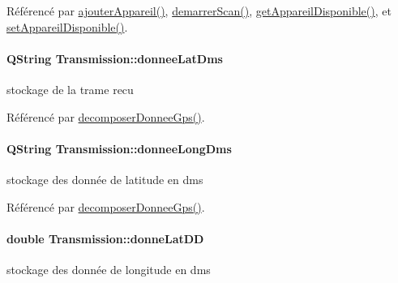 Référencé par \hyperlink{class_transmission_aeeccf41fd32a4bb17d3312d785aec98a}{ajouter\+Appareil()}, \hyperlink{class_transmission_a217b97344fdad09dbe226c55a8ac56b0}{demarrer\+Scan()}, \hyperlink{class_transmission_a2a38d0633b4a27dfa3754efcd3db4f9c}{get\+Appareil\+Disponible()}, et \hyperlink{class_transmission_ad2c1d8838a1f7ed8d3599dba0a118a86}{set\+Appareil\+Disponible()}.

\paragraph[{\texorpdfstring{donnee\+Lat\+Dms}{donneeLatDms}}]{\setlength{\rightskip}{0pt plus 5cm}Q\+String Transmission\+::donnee\+Lat\+Dms\hspace{0.3cm}{\ttfamily [private]}}\hypertarget{class_transmission_a82596aa40988da67b05174375d9cfadb}{}\label{class_transmission_a82596aa40988da67b05174375d9cfadb}
stockage de la trame recu 

Référencé par \hyperlink{class_transmission_acc25e99cce910d23efe684cad233d30e}{decomposer\+Donnee\+Gps()}.

\paragraph[{\texorpdfstring{donnee\+Long\+Dms}{donneeLongDms}}]{\setlength{\rightskip}{0pt plus 5cm}Q\+String Transmission\+::donnee\+Long\+Dms\hspace{0.3cm}{\ttfamily [private]}}\hypertarget{class_transmission_abd43fbd8ce97a99ebfd1048a9b2297cf}{}\label{class_transmission_abd43fbd8ce97a99ebfd1048a9b2297cf}
stockage des donnée de latitude en dms 

Référencé par \hyperlink{class_transmission_acc25e99cce910d23efe684cad233d30e}{decomposer\+Donnee\+Gps()}.

\paragraph[{\texorpdfstring{donne\+Lat\+DD}{donneLatDD}}]{\setlength{\rightskip}{0pt plus 5cm}double Transmission\+::donne\+Lat\+DD\hspace{0.3cm}{\ttfamily [private]}}\hypertarget{class_transmission_a4c7537ba62aa4ffa286ef269974e9571}{}\label{class_transmission_a4c7537ba62aa4ffa286ef269974e9571}
stockage des donnée de longitude en dms 

